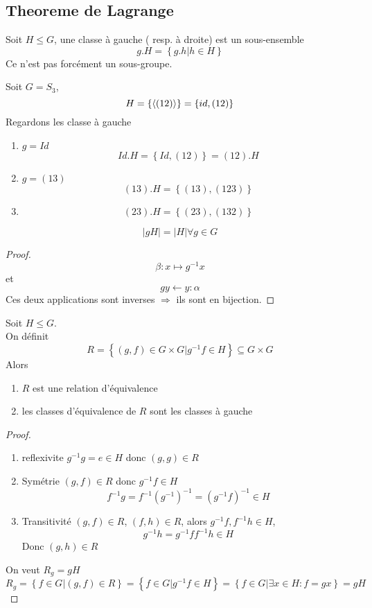 \documentclass[../main.tex]{subfiles}
\begin{document}
\subsection{Theoreme de Lagrange}
\begin{defn}
	Soit $H \leq G$, une classe à gauche ( resp. à droite) est un sous-ensemble 
	\[ 
	g.H = \left\{ g.h | h \in H \right\} 
	\]
	Ce n'est pas forcément un sous-groupe.
\end{defn}
\begin{exemple}
	Soit $G= S_3$,
	\[ 
		H = \left\{ \left\langle( 12) \right\rangle \right\} = \left\{ id, ( 12)  \right\} 
	\]
Regardons les classe à gauche
\begin{enumerate}
\item $g= Id$ 
	\[ 
		Id.H = \left\{ Id, ( 12)  \right\} = ( 12).H
	\]

\item $g= ( 13) $ 
	\[ 
		( 13) . H = \left\{ ( 13) ,( 123)  \right\} 
	\]

\item 
	\[ 
		( 23) .H = \left\{ ( 23) ,( 132)  \right\} 
	\]
	
	
\end{enumerate}
\end{exemple}
\begin{lemma}
\[ 
|gH| = |H| \forall g \in G
\]
\end{lemma}
\begin{proof}
\[ 
	\beta: x \mapsto g^{-1}x
\]
et 
 \[ 
gy \leftarrow y : \alpha
\]
Ces deux applications sont inverses $\Rightarrow$ ils sont en bijection.
\end{proof}
\begin{propo}
Soit $H \leq G$.\\
On définit
\[ 
	R = \left\{ ( g,f) \in G \times G | g^{-1}f \in H \right\}  \subseteq G \times G
\]
Alors
\begin{enumerate}
\item $R$ est une relation d'équivalence
\item les classes d'équivalence de $R$ sont les classes à gauche
\end{enumerate}

\end{propo}
\begin{proof}
\begin{enumerate}
	\item reflexivite $g^{-1}g = e \in H$ donc $( g,g)  \in R$ 
	\item Symétrie $( g,f)  \in R$ donc $g^{-1}f\in H$ 
		\[ 
	f^{-1}g = f^{-1}( g^{-1} )^{-1} = ( g^{-1}f) ^{-1} \in H
		\]
	\item Transitivité $( g,f ) \in R$, $( f,h) \in R$, alors $g^{-1}f, f^{-1}h \in H$,
		\[ 
		g^{-1}h = g^{-1}f f^{-1}h \in H
		\]
		Donc $( g,h) \in R$
	

\end{enumerate}
On veut $R_g = gH$ 
\[ 
	R_g =  \left\{ f \in G | ( g,f) \in R \right\}  = \left\{ f \in G | g^{-1}f \in H \right\} = \left\{ f \in G | \exists x \in H: f = gx \right\} = gH
\]


\end{proof}
\end{document}

